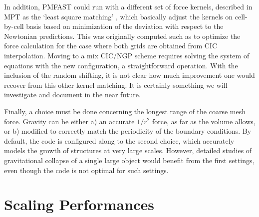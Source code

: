 \documentclass[useAMS,usenatbib]{mn2e}
\begin{document}
In addition, {\small PMFAST} could run with a different set of force kernels, described in MPT as the `least square matching' , 
which basically adjust the kernels on cell-by-cell basis based on minimization of the deviation with respect
to the Newtonian predictions. This was originally computed such as to optimize the force calculation for
the case where both grids are obtained from CIC interpolation. Moving to a mix CIC/NGP scheme
requires solving the system of equations with the new configuration, a straightforward operation.
 With the inclusion of the random shifting, it is not clear how much improvement 
one would recover from this other kernel matching.  It is certainly something
we will investigate and document in the near future.


Finally, a choice must be done concerning the longest range of the coarse mesh force. Gravity can be either a) an accurate $1/r^2$ force, as far as the volume allows, 
or b) modified to correctly match the periodicity of the boundary conditions. By default, the code is configured along to the second choice,
which accurately models the growth of structures at very large scales. However, detailed studies of gravitational collapse of a single large object would benefit 
from the first settings, even though the code is not optimal for such settings.


%

\section{Scaling Performances}
\label{sec:scaling}
\end{document}
